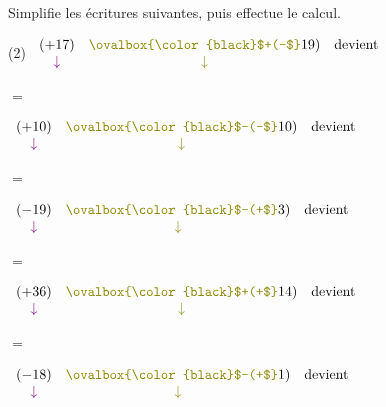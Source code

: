 \documentclass[a4paper,11pt]{report}
\begin{document}
\begin{exop}
{Simplifie les écritures suivantes, puis effectue le calcul.

\bigskip

\begin{tasks}(2)
\task $\begin{array}{cccc}
(+17)&{\color{olive}\ovalbox{\color{black}$+(-$}}19)& \mbox{devient} \\
{\color{violet}\downarrow}&{\color{olive}\downarrow}& & \\
\end{array}$

\vspace*{.7cm} $=$

\task $\begin{array}{cccc}
(+10)&{\color{olive}\ovalbox{\color{black}$-(-$}}10)& \mbox{devient} \\
{\color{violet}\downarrow}&{\color{olive}\downarrow}& & \\
\end{array}$

\vspace*{.7cm} $=$

\task $\begin{array}{cccc}
(-19)&{\color{olive}\ovalbox{\color{black}$-(+$}}3)& \mbox{devient} \\
{\color{violet}\downarrow}&{\color{olive}\downarrow}& & \\
\end{array}$

\vspace*{.7cm} $=$

\task $\begin{array}{cccc}
(+36)&{\color{olive}\ovalbox{\color{black}$+(+$}}14)& \mbox{devient} \\
{\color{violet}\downarrow}&{\color{olive}\downarrow}& & \\
\end{array}$

\vspace*{.7cm} $=$

\task $\begin{array}{cccc}
(-18)&{\color{olive}\ovalbox{\color{black}$-(+$}}1)& \mbox{devient} \\
{\color{violet}\downarrow}&{\color{olive}\downarrow}& & \\
\end{array}$


\end{tasks}}
\end{exop}
\end{document}

